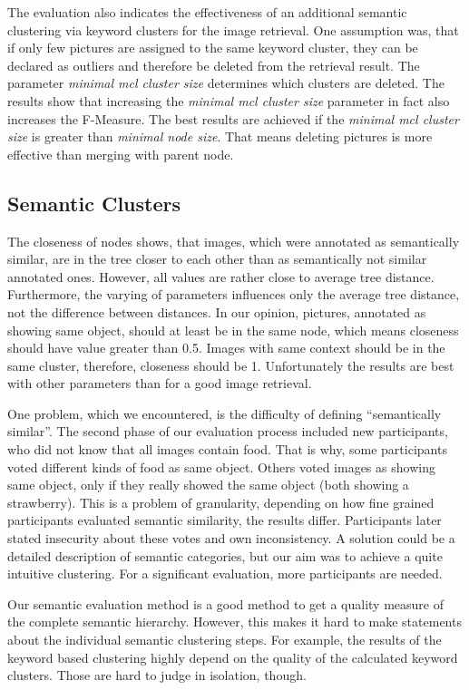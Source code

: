 \bigskip
The evaluation also indicates the effectiveness of an additional semantic clustering via keyword clusters for the image retrieval. One assumption was, that if only few pictures are assigned to the same keyword cluster, they can be declared as outliers and therefore be deleted from the retrieval result. The parameter \emph{minimal mcl cluster size} determines which clusters are deleted. The results show that increasing the \emph{minimal mcl cluster size} parameter in fact also increases the F-Measure. The best results are achieved if the \emph{minimal mcl cluster size} is greater than \emph{minimal node size}. That means deleting pictures is more effective than merging with parent node.

\subsection{Semantic Clusters}	
The closeness of nodes shows, that images, which were annotated as semantically similar, are in the tree closer to each other than as semantically not similar annotated ones. However, all values are rather close to average tree distance. Furthermore, the varying of parameters influences only the average tree distance, not the difference between distances. In our opinion, pictures, annotated as showing same object, should at least be in the same node, which means closeness should have value greater than 0.5. Images with same context should be in the same cluster, therefore, closeness should be 1. Unfortunately the results are best with other parameters than for a good image retrieval.

\bigskip
One problem, which we encountered, is the difficulty of defining ``semantically similar''. The second phase of our evaluation process included new participants, who did not know that all images contain food. That is why, some participants voted different kinds of food as same object. Others voted images as showing same object, only if they really showed the same object (both showing a strawberry). This is a problem of granularity, depending on how fine grained participants evaluated semantic similarity, the results differ. Participants later stated insecurity about these votes and own inconsistency. A solution could be a detailed description of semantic categories, but our aim was to achieve a quite intuitive clustering. For a significant evaluation, more participants are needed.

\bigskip
Our semantic evaluation method is a good method to get a quality measure of the complete semantic hierarchy. However, this makes it hard to make statements about the individual semantic clustering steps. For example, the results of the keyword based clustering highly depend on the quality of the calculated keyword clusters. Those are hard to judge in isolation, though.\\	

